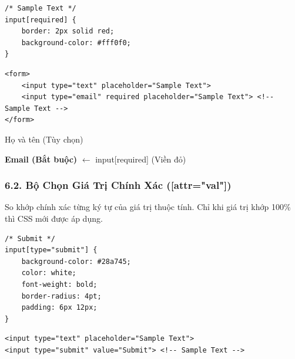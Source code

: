 \begin{codeWindow}
\begin{lstlisting}[language=CSS3]
/* Sample Text */
input[required] {
    border: 2px solid red;
    background-color: #fff0f0;
}
\end{lstlisting}

\begin{lstlisting}[language=HTML5]
<form>
    <input type="text" placeholder="Sample Text">
    <input type="email" required placeholder="Sample Text"> <!-- Sample Text -->
</form>
\end{lstlisting}
\end{codeWindow}

\begin{browserWindow}
\sffamily\small
\begin{tcolorbox}[arc=2pt, colback=white, colframe=gray!30, boxrule=1pt, width=7.5cm]
\textcolor{gray!70}{Họ và tên (Tùy chọn)} \par\vspace{4pt}
\begin{tcolorbox}[arc=2pt, colback=red!5, colframe=red!70, boxrule=1.5pt, boxsep=2pt]
\textcolor{red!80!black}{\textbf{Email (Bắt buộc)}} \hfill \textcolor{red!70}{\scriptsize $\leftarrow$ input[required] (Viền đỏ)}
\end{tcolorbox}
\end{tcolorbox}
\end{browserWindow}

\subsubsection{6.2. Bộ Chọn Giá Trị Chính Xác ([attr="val"])}

\begin{conceptBox}
So khớp chính xác từng ký tự của giá trị thuộc tính. Chỉ khi giá trị khớp 100\% thì CSS mới được áp dụng.
\end{conceptBox}

\begin{codeWindow}
\begin{lstlisting}[language=CSS3]
/* Submit */
input[type="submit"] {
    background-color: #28a745;
    color: white;
    font-weight: bold;
    border-radius: 4pt;
    padding: 6px 12px;
}
\end{lstlisting}

\begin{lstlisting}[language=HTML5]
<input type="text" placeholder="Sample Text">
<input type="submit" value="Submit"> <!-- Sample Text -->
\end{lstlisting}
\end{codeWindow}

